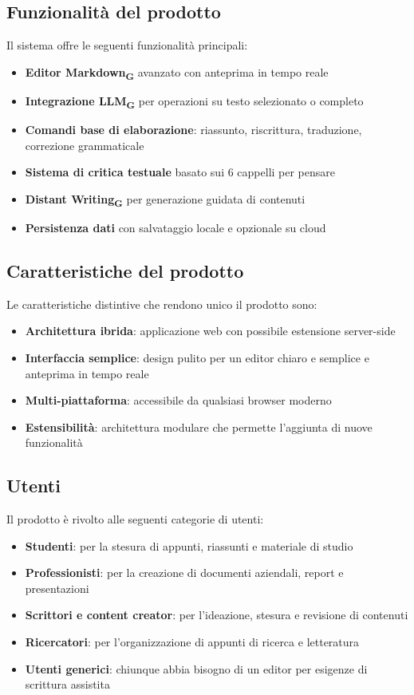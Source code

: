 \documentclass[11pt,a4paper]{article}
\begin{document}
\subsection{Funzionalità del prodotto}
Il sistema offre le seguenti funzionalità principali:

\begin{itemize}
    \item \textbf{Editor Markdown\textsubscript{G}} avanzato con anteprima in tempo reale
    \item \textbf{Integrazione LLM\textsubscript{G}} per operazioni su testo selezionato o completo
    \item \textbf{Comandi base di elaborazione}: riassunto, riscrittura, traduzione, correzione grammaticale
    \item \textbf{Sistema di critica testuale} basato sui 6 cappelli per pensare
    \item \textbf{Distant Writing\textsubscript{G}} per generazione guidata di contenuti
    \item \textbf{Persistenza dati} con salvataggio locale e opzionale su cloud
\end{itemize}

\subsection{Caratteristiche del prodotto}
Le caratteristiche distintive che rendono unico il prodotto sono:

\begin{itemize}
    \item \textbf{Architettura ibrida}: applicazione web con possibile estensione server-side
    \item \textbf{Interfaccia semplice}: design pulito per un editor chiaro e semplice e anteprima in tempo reale
    \item \textbf{Multi-piattaforma}: accessibile da qualsiasi browser moderno
    \item \textbf{Estensibilità}: architettura modulare che permette l'aggiunta di nuove funzionalità
    
\end{itemize}

\subsection{Utenti}
Il prodotto è rivolto alle seguenti categorie di utenti:

\begin{itemize}
    \item \textbf{Studenti}: per la stesura di appunti, riassunti e materiale di studio
    \item \textbf{Professionisti}: per la creazione di documenti aziendali, report e presentazioni
    \item \textbf{Scrittori e content creator}: per l'ideazione, stesura e revisione di contenuti
    \item \textbf{Ricercatori}: per l'organizzazione di appunti di ricerca e letteratura
    \item \textbf{Utenti generici}: chiunque abbia bisogno di un editor per esigenze di scrittura assistita
\end{itemize}
\end{document}
